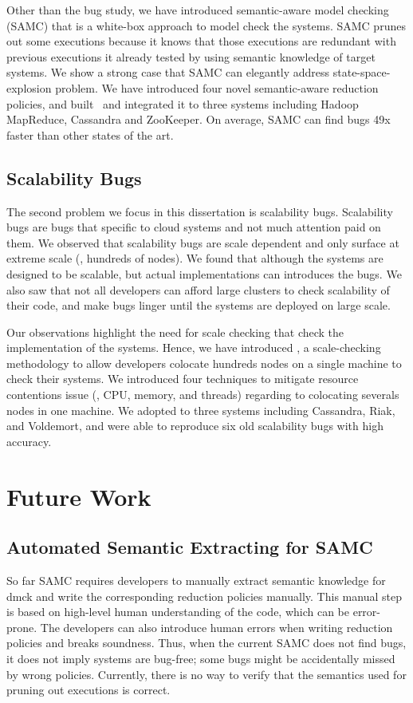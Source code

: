 Other than the bug study, we have introduced semantic-aware model checking
(SAMC) that is a white-box approach to model check the systems. SAMC prunes out
some executions because it knows that those executions are redundant with
previous executions it already tested by using semantic knowledge of target
systems. We show a strong case that SAMC can elegantly address
state-space-explosion problem. We have introduced four novel semantic-aware
reduction policies, and built \sampro\ and integrated it to three systems
including Hadoop MapReduce, Cassandra and ZooKeeper. On average, SAMC can find
bugs 49x faster than other states of the art.

\subsection{Scalability Bugs}

The second problem we focus in this dissertation is scalability bugs.
Scalability bugs are bugs that specific to cloud systems and not much attention
paid on them. We observed that scalability bugs are scale dependent and only
surface at extreme scale (\eg, hundreds of nodes). We found that although the
systems are designed to be scalable, but actual implementations can introduces
the bugs. We also saw that not all developers can afford large clusters to check
scalability of their code, and make bugs linger until the systems are deployed
on large scale.

Our observations highlight the need for scale checking that check the
implementation of the systems. Hence, we have introduced \sck, a scale-checking
methodology to allow developers colocate hundreds nodes on a single machine to
check their systems. We introduced four techniques to mitigate resource
contentions issue (\ie, CPU, memory, and threads) regarding to colocating
severals nodes in one machine. We adopted \sck to three systems including
Cassandra, Riak, and Voldemort, and were able to reproduce six old scalability
bugs with high accuracy.

\section{Future Work}

\subsection{Automated Semantic Extracting for SAMC}

So far SAMC requires developers to manually extract semantic knowledge for dmck
and write the corresponding reduction policies manually. This manual step is
based on high-level human understanding of the code, which can be error-prone.
The developers can also introduce human errors when writing reduction policies
and breaks soundness. Thus, when the current SAMC does not find bugs, it does
not imply systems are bug-free; some bugs might be accidentally missed by wrong
policies. Currently, there is no way to verify that the semantics used for
pruning out executions is correct.

